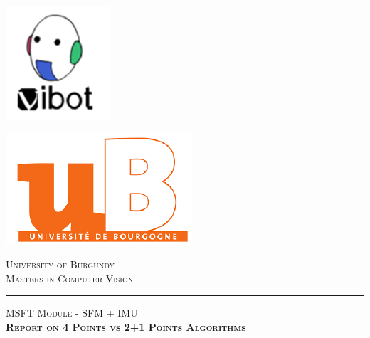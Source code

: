 \documentclass[a4paper,12pt]{article}
\newcommand{\HRule}{\rule{\linewidth}{0.5mm}}
\begin{document}
\begin{minipage}{0.50\textwidth} 
	\begin{flushleft}
	\includegraphics[scale = 0.50]{Images/Logo-vibot.png}
	\end{flushleft}
\end{minipage}
\begin{minipage}{0.50\textwidth} 
	\begin{flushright}
		\includegraphics[scale = 0.50]{Images/Logo-ub.png}
	\end{flushright}
\end{minipage}

\begin{center} 
	\vspace*{-1cm}
	\textsc{\Large University of Burgundy}\\[0.5cm]

	\textsc{\Large Masters in Computer Vision}
\end{center}
\vspace*{-0.5cm}
\HRule
\vspace*{4cm}


\begin{minipage}{0.9\textwidth} 
	\begin{center}																					%
		\textsc{\LARGE MSFT Module - SFM + IMU} \\[0.5cm]
		\textsc{\LARGE \textbf{Report on 4 Points vs 2+1 Points Algorithms}} \\
		
	\end{center}
\end{minipage}\\[1.5cm]
\end{document}
